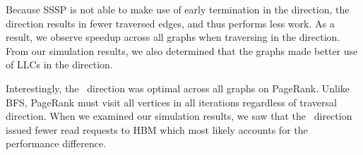 Because SSSP is not able to make use of early termination in the \pull direction, the \push direction results in fewer traversed edges, and thus performs less work.
As a result, we observe speedup across all graphs when traversing in the \push direction.
From our simulation results, we also determined that the graphs made better use of LLCs in the \push direction.
 
Interestingly, the \pull~direction was optimal across all graphs on PageRank.
Unlike BFS, PageRank must visit all vertices in all iterations regardless of traversal direction.
When we examined our simulation results, we saw that the \pull~direction issued fewer read requests to HBM which most likely accounts for the performance difference.  

 


